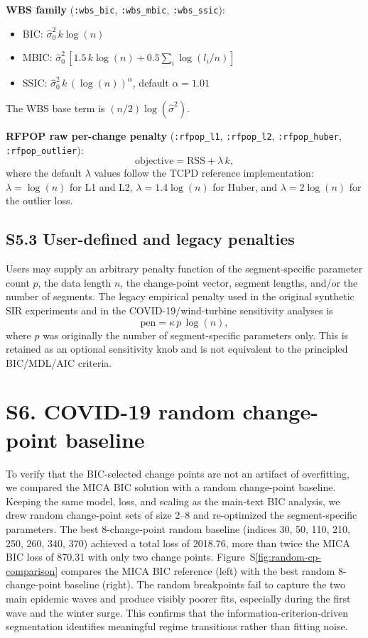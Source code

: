 \documentclass[11pt,a4paper]{article}
\begin{document}
\textbf{WBS family} (\texttt{:wbs\_bic}, \texttt{:wbs\_mbic}, \texttt{:wbs\_ssic}):
\begin{itemize}
    \item BIC: \(\widehat{\sigma}^2_0 \, k \log(n)\)
    \item MBIC: \(\widehat{\sigma}^2_0 \, \left[1.5 \, k \log(n) + 0.5 \sum_i \log(l_i/n)\right]\)
    \item SSIC: \(\widehat{\sigma}^2_0 \, k \, (\log(n))^{\alpha}\), default \(\alpha = 1.01\)
\end{itemize}
The WBS base term is \((n/2) \log(\widehat{\sigma}^2)\).

\textbf{RFPOP raw per-change penalty} (\texttt{:rfpop\_l1}, \texttt{:rfpop\_l2}, \texttt{:rfpop\_huber}, \texttt{:rfpop\_outlier}):
\[
\mathrm{objective} = \mathrm{RSS} + \lambda \, k,
\]
where the default \(\lambda\) values follow the TCPD reference implementation: \(\lambda = \log(n)\) for L1 and L2, \(\lambda = 1.4 \log(n)\) for Huber, and \(\lambda = 2 \log(n)\) for the outlier loss.

\subsection*{S5.3 User-defined and legacy penalties}

Users may supply an arbitrary penalty function of the segment-specific parameter count \(p\), the data length \(n\), the change-point vector, segment lengths, and/or the number of segments. The legacy empirical penalty used in the original synthetic SIR experiments and in the COVID-19/wind-turbine sensitivity analyses is
\[
\mathrm{pen} = \kappa \, p \, \log(n),
\]
where \(p\) was originally the number of segment-specific parameters only. This is retained as an optional sensitivity knob and is not equivalent to the principled BIC/MDL/AIC criteria.

\section*{S6. COVID-19 random change-point baseline}

To verify that the BIC-selected change points are not an artifact of overfitting, we compared the MICA BIC solution with a random change-point baseline. Keeping the same model, loss, and scaling as the main-text BIC analysis, we drew random change-point sets of size 2--8 and re-optimized the segment-specific parameters. The best 8-change-point random baseline (indices 30, 50, 110, 210, 250, 260, 340, 370) achieved a total loss of 2018.76, more than twice the MICA BIC loss of 870.31 with only two change points. Figure~S\ref{fig:random-cp-comparison} compares the MICA BIC reference (left) with the best random 8-change-point baseline (right). The random breakpoints fail to capture the two main epidemic waves and produce visibly poorer fits, especially during the first wave and the winter surge. This confirms that the information-criterion-driven segmentation identifies meaningful regime transitions rather than fitting noise.
\end{document}
